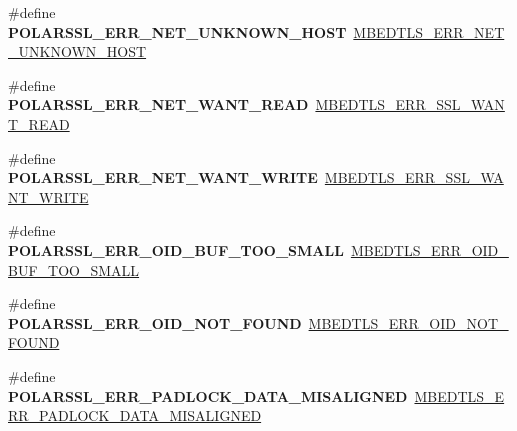 \begin{DoxyCompactItemize}
\item 
\mbox{\label{compat-1_83_8h_a8b8dc4d3104b157a2ade8da7831f48f1}} 
\#define {\bfseries P\+O\+L\+A\+R\+S\+S\+L\+\_\+\+E\+R\+R\+\_\+\+N\+E\+T\+\_\+\+U\+N\+K\+N\+O\+W\+N\+\_\+\+H\+O\+ST}~\mbox{\hyperlink{net__sockets_8h_a937d55e9aa02f1554a43f562a5fc24f9}{M\+B\+E\+D\+T\+L\+S\+\_\+\+E\+R\+R\+\_\+\+N\+E\+T\+\_\+\+U\+N\+K\+N\+O\+W\+N\+\_\+\+H\+O\+ST}}
\item 
\mbox{\label{compat-1_83_8h_a5f74d0f93745d7b4a7d46a6b78c0fb4a}} 
\#define {\bfseries P\+O\+L\+A\+R\+S\+S\+L\+\_\+\+E\+R\+R\+\_\+\+N\+E\+T\+\_\+\+W\+A\+N\+T\+\_\+\+R\+E\+AD}~\mbox{\hyperlink{ssl_8h_a67a1e093cf042831aa60bb567915b560}{M\+B\+E\+D\+T\+L\+S\+\_\+\+E\+R\+R\+\_\+\+S\+S\+L\+\_\+\+W\+A\+N\+T\+\_\+\+R\+E\+AD}}
\item 
\mbox{\label{compat-1_83_8h_a714269000de1543b4f4a3e8d6622a979}} 
\#define {\bfseries P\+O\+L\+A\+R\+S\+S\+L\+\_\+\+E\+R\+R\+\_\+\+N\+E\+T\+\_\+\+W\+A\+N\+T\+\_\+\+W\+R\+I\+TE}~\mbox{\hyperlink{ssl_8h_a674bde213fbbf602e04bbc131dd2dc33}{M\+B\+E\+D\+T\+L\+S\+\_\+\+E\+R\+R\+\_\+\+S\+S\+L\+\_\+\+W\+A\+N\+T\+\_\+\+W\+R\+I\+TE}}
\item 
\mbox{\label{compat-1_83_8h_ae3b03c046cf81804af99f84472d0198d}} 
\#define {\bfseries P\+O\+L\+A\+R\+S\+S\+L\+\_\+\+E\+R\+R\+\_\+\+O\+I\+D\+\_\+\+B\+U\+F\+\_\+\+T\+O\+O\+\_\+\+S\+M\+A\+LL}~\mbox{\hyperlink{oid_8h_a27d099496daecdd521df484630694270}{M\+B\+E\+D\+T\+L\+S\+\_\+\+E\+R\+R\+\_\+\+O\+I\+D\+\_\+\+B\+U\+F\+\_\+\+T\+O\+O\+\_\+\+S\+M\+A\+LL}}
\item 
\mbox{\label{compat-1_83_8h_ad8e52f52ec11b6f9f1f29d873e4892e0}} 
\#define {\bfseries P\+O\+L\+A\+R\+S\+S\+L\+\_\+\+E\+R\+R\+\_\+\+O\+I\+D\+\_\+\+N\+O\+T\+\_\+\+F\+O\+U\+ND}~\mbox{\hyperlink{oid_8h_a9a731a2f6abe093916b7b97e79761bdb}{M\+B\+E\+D\+T\+L\+S\+\_\+\+E\+R\+R\+\_\+\+O\+I\+D\+\_\+\+N\+O\+T\+\_\+\+F\+O\+U\+ND}}
\item 
\mbox{\label{compat-1_83_8h_a7bf951307cad103081121acec3ddfabf}} 
\#define {\bfseries P\+O\+L\+A\+R\+S\+S\+L\+\_\+\+E\+R\+R\+\_\+\+P\+A\+D\+L\+O\+C\+K\+\_\+\+D\+A\+T\+A\+\_\+\+M\+I\+S\+A\+L\+I\+G\+N\+ED}~\mbox{\hyperlink{padlock_8h_af5c37201b6033a4981bfbf5ebc51ba72}{M\+B\+E\+D\+T\+L\+S\+\_\+\+E\+R\+R\+\_\+\+P\+A\+D\+L\+O\+C\+K\+\_\+\+D\+A\+T\+A\+\_\+\+M\+I\+S\+A\+L\+I\+G\+N\+ED}}

\end{DoxyCompactItemize}
